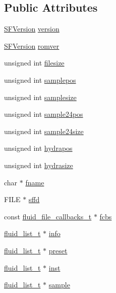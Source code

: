 \subsection*{Public Attributes}
\begin{DoxyCompactItemize}
\item 
\hyperlink{fluid__sffile_8h_abd218ce0bb10f13c622c5b605abccbc9}{S\+F\+Version} \hyperlink{struct__SFData_a9109780bbe02f384a94e9d24e0ec846f}{version}
\item 
\hyperlink{fluid__sffile_8h_abd218ce0bb10f13c622c5b605abccbc9}{S\+F\+Version} \hyperlink{struct__SFData_a2a4feef795087124e319dda9a158e54c}{romver}
\item 
unsigned int \hyperlink{struct__SFData_a55904b5c9ba7ca7362e94b16b0b8f948}{filesize}
\item 
unsigned int \hyperlink{struct__SFData_a89557172c531de1c48dbd022356402bd}{samplepos}
\item 
unsigned int \hyperlink{struct__SFData_aa3a82e9c589147d510648ce48f2a4a4e}{samplesize}
\item 
unsigned int \hyperlink{struct__SFData_a459013f876fdb92c2b96b947b90aee9c}{sample24pos}
\item 
unsigned int \hyperlink{struct__SFData_a6cb0544df2b35c29e0f28ae6b14e8544}{sample24size}
\item 
unsigned int \hyperlink{struct__SFData_ae4b21b0facadb6e10bf845ed24be6e8f}{hydrapos}
\item 
unsigned int \hyperlink{struct__SFData_a0ad518d7aeae7af1d7ab1c366c2d160c}{hydrasize}
\item 
char $\ast$ \hyperlink{struct__SFData_a443554dc070c7704a726d58c005b59fc}{fname}
\item 
F\+I\+LE $\ast$ \hyperlink{struct__SFData_adf8fa1a6f5cc4d04cc262a2f79212c87}{sffd}
\item 
const \hyperlink{types_8h_a6a223e4b8d83753d95c87e1feed58227}{fluid\+\_\+file\+\_\+callbacks\+\_\+t} $\ast$ \hyperlink{struct__SFData_a4a41c032207e3a9cbe55019e48192815}{fcbs}
\item 
\hyperlink{fluid__list_8h_a3ef7535d4290862c0af118569223bd89}{fluid\+\_\+list\+\_\+t} $\ast$ \hyperlink{struct__SFData_aa9fd55a01bfcc8002d7bdd47506e92be}{info}
\item 
\hyperlink{fluid__list_8h_a3ef7535d4290862c0af118569223bd89}{fluid\+\_\+list\+\_\+t} $\ast$ \hyperlink{struct__SFData_ab95484883b0576f0bb77afd63cfa1e8b}{preset}
\item 
\hyperlink{fluid__list_8h_a3ef7535d4290862c0af118569223bd89}{fluid\+\_\+list\+\_\+t} $\ast$ \hyperlink{struct__SFData_aa9b9f9529eb19a65904833dd5408ac7b}{inst}
\item 
\hyperlink{fluid__list_8h_a3ef7535d4290862c0af118569223bd89}{fluid\+\_\+list\+\_\+t} $\ast$ \hyperlink{struct__SFData_aa9e23a56282832caf4634982315b3743}{sample}
\end{DoxyCompactItemize}


